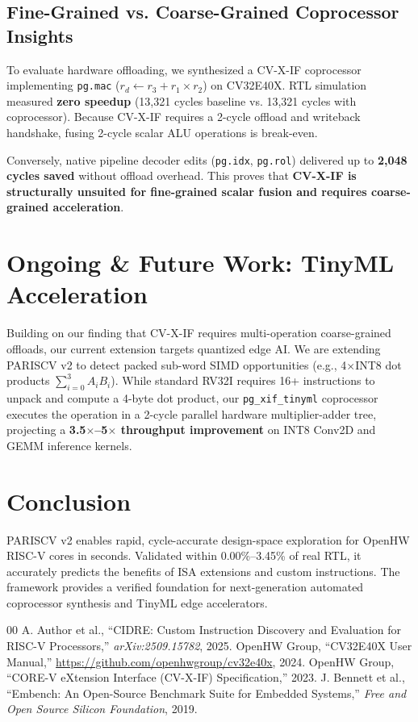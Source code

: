 \documentclass[conference]{IEEEtran}
\begin{document}
\subsection{Fine-Grained vs. Coarse-Grained Coprocessor Insights}
To evaluate hardware offloading, we synthesized a CV-X-IF coprocessor implementing \texttt{pg.mac} ($r_d \leftarrow r_3 + r_1 \times r_2$) on CV32E40X. RTL simulation measured \textbf{zero speedup} (13,321 cycles baseline vs. 13,321 cycles with coprocessor). Because CV-X-IF requires a 2-cycle offload and writeback handshake, fusing 2-cycle scalar ALU operations is break-even. 

Conversely, native pipeline decoder edits (\texttt{pg.idx}, \texttt{pg.rol}) delivered up to \textbf{2,048 cycles saved} without offload overhead. This proves that \textbf{CV-X-IF is structurally unsuited for fine-grained scalar fusion and requires coarse-grained acceleration}.

\section{Ongoing \& Future Work: TinyML Acceleration}
Building on our finding that CV-X-IF requires multi-operation coarse-grained offloads, our current extension targets quantized edge AI. We are extending PARISCV v2 to detect packed sub-word SIMD opportunities (e.g., 4$\times$INT8 dot products $\sum_{i=0}^3 A_i B_i$). While standard RV32I requires 16+ instructions to unpack and compute a 4-byte dot product, our \texttt{pg\_xif\_tinyml} coprocessor executes the operation in a 2-cycle parallel hardware multiplier-adder tree, projecting a \textbf{3.5$\times$--5$\times$ throughput improvement} on INT8 Conv2D and GEMM inference kernels.

\section{Conclusion}
PARISCV v2 enables rapid, cycle-accurate design-space exploration for OpenHW RISC-V cores in seconds. Validated within 0.00\%--3.45\% of real RTL, it accurately predicts the benefits of ISA extensions and custom instructions. The framework provides a verified foundation for next-generation automated coprocessor synthesis and TinyML edge accelerators.

\begin{thebibliography}{00}
 A. Author et al., ``CIDRE: Custom Instruction Discovery and Evaluation for RISC-V Processors,'' \emph{arXiv:2509.15782}, 2025.
 OpenHW Group, ``CV32E40X User Manual,'' \url{https://github.com/openhwgroup/cv32e40x}, 2024.
 OpenHW Group, ``CORE-V eXtension Interface (CV-X-IF) Specification,'' 2023.
 J. Bennett et al., ``Embench: An Open-Source Benchmark Suite for Embedded Systems,'' \emph{Free and Open Source Silicon Foundation}, 2019.
\end{thebibliography}
\end{document}
